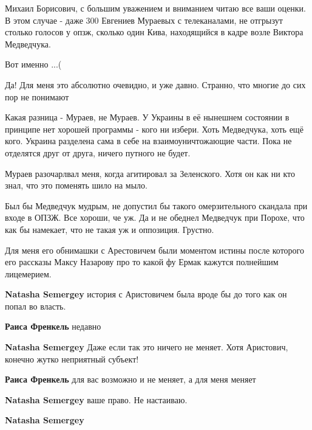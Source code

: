 \begin{itemize}

Михаил Борисович, с большим уважением и вниманием читаю все ваши оценки. В этом
случае - даже 300 Евгениев Мураевых с телеканалами, не отгрызут столько голосов
у опзж, сколько один Кива, находящийся в кадре возле Виктора Медведчука.


Вот именно ...(


Да! Для меня это абсолютно очевидно, и уже давно. Странно, что многие до сих
пор не понимают


Какая разница - Мураев, не Мураев. У Украины в её нынешнем состоянии в принципе
нет хорошей программы - кого ни избери. Хоть Медведчука, хоть ещё кого. Украина
разделена сама в себе на взаимоуничтожающие части. Пока не отделятся друг от
друга, ничего путного не будет.


Мураев разочарлвал меня, когда агитировал за Зеленского. Хотя он как ни кто
знал, что это поменять шило на мыло.


Был бы Медведчук мудрым, не допустил бы такого омерзительного скандала при
входе в ОПЗЖ. Все хороши, че уж. Да и не обеднел Медведчук при Порохе, что как
бы намекает, что не такая уж и оппозиция. Грустно.


Для меня его обнимашки с Арестовичем были моментом истины после которого его
рассказы Максу Назарову про то какой фу Ермак кажутся полнейшим лицемерием.

\begin{itemize} %
\textbf{Natasha Semergey} история с Аристовичем была вроде бы до того как он попал во власть.

\textbf{Раиса Френкель} недавно

\textbf{Natasha Semergey} Даже если так это ничего не меняет. Хотя Аристович, конечно жутко неприятный субъект!

\textbf{Раиса Френкель} для вас возможно и не меняет, а для меня меняет

\textbf{Natasha Semergey} ваше право. Не настаиваю.

\textbf{Natasha Semergey} 


\end{itemize}
\end{itemize}
